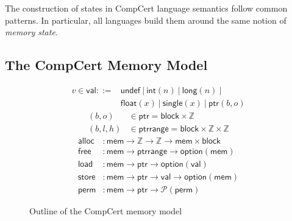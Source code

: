 \documentclass[sigplan,10pt,review,anonymous]{acmart}
\newcommand{\kw}[1]{\ensuremath{ \mathsf{#1} }}
\newcommand{\alt}{\ |\ } %
\begin{document}
%

The construction of states in CompCert language semantics
follow common patterns.
In particular,
all languages build them around
the same notion of \emph{memory state}.


\subsection{The CompCert Memory Model} \label{sec:sem:mm} %

\begin{figure} %
  \begin{align*}
    v \in \kw{val} ::= {} &
          \kw{undef} \alt
          \kw{int}(n) \alt
          \kw{long}(n) \alt \\ &
          \kw{float}(x) \alt
          \kw{single}(x) \alt
          \kw{ptr}(b, o)
  \end{align*}
  \begin{align*}
    (b, o) &\in \kw{ptr} =
      \kw{block} \times \mathbb{Z}
    \\
    (b, l, h) &\in \kw{ptrrange} =
      \kw{block} \times \mathbb{Z} \times \mathbb{Z}
  \end{align*}
  \begin{align*}
    \kw{alloc} &:
      \kw{mem} \rightarrow \mathbb{Z} \rightarrow \mathbb{Z} \rightarrow
      \kw{mem} \times \kw{block}
    \\
    \kw{free} &:
      \kw{mem} \rightarrow
      \kw{ptrrange} \rightarrow
      \kw{option}(\kw{mem})
    \\
    \kw{load} &:
      \kw{mem} \rightarrow \kw{ptr} \rightarrow \kw{option}(\kw{val})
    \\
    \kw{store} &:
      \kw{mem} \rightarrow \kw{ptr} \rightarrow \kw{val} \rightarrow \kw{option}(\kw{mem})
    \\
    \kw{perm} &:
      \kw{mem} \rightarrow \kw{ptr} \rightarrow \mathcal{P}(\kw{perm})
  \end{align*}
  \caption{Outline of the CompCert memory model}
  \label{fig:mm}
\end{figure}
\end{document}

